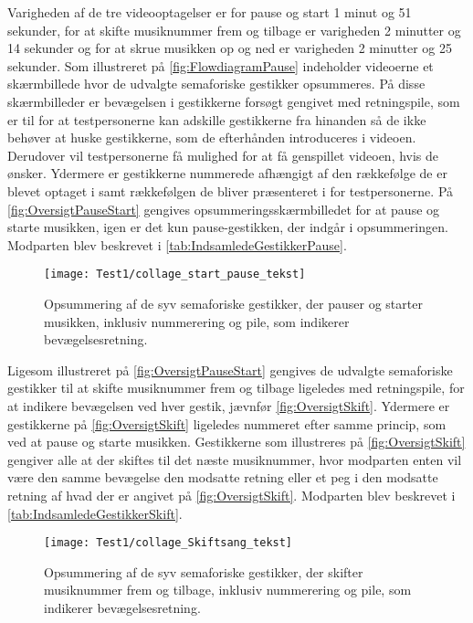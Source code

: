 Varigheden af de tre videooptagelser er for pause og start 1 minut og 51 sekunder, for at skifte musiknummer frem og tilbage er varigheden 2 minutter og 14 sekunder og for at skrue musikken op og ned er varigheden 2 minutter og 25 sekunder.\blankline
%
Som illustreret på \autoref{fig:FlowdiagramPause} indeholder videoerne et skærmbillede hvor de udvalgte semaforiske gestikker opsummeres. På disse skærmbilleder er bevægelsen i gestikkerne forsøgt gengivet med retningspile, som er til for at testpersonerne kan adskille gestikkerne fra hinanden så de ikke behøver at huske gestikkerne, som de efterhånden introduceres i videoen. Derudover vil testpersonerne få mulighed for at få genspillet videoen, hvis de ønsker. Ydermere er gestikkerne nummerede afhængigt af den rækkefølge de er blevet optaget i samt rækkefølgen de bliver præsenteret i for testpersonerne. På \autoref{fig:OversigtPauseStart} gengives opsummeringsskærmbilledet for at pause og starte musikken, igen er det kun pause-gestikken, der indgår i opsummeringen. Modparten blev beskrevet i \autoref{tab:IndsamledeGestikkerPause}.  
% 
\begin{figure}[H]
	\centering
	\texttt{[image: Test1/collage\_start\_pause\_tekst]}
	\caption{Opsummering af de syv semaforiske gestikker, der pauser og starter musikken, inklusiv nummerering og pile, som indikerer bevægelsesretning.}
	\label{fig:OversigtPauseStart}
\end{figure}
\noindent
%
Ligesom illustreret på \autoref{fig:OversigtPauseStart} gengives de udvalgte semaforiske gestikker til at skifte musiknummer frem og tilbage ligeledes med retningspile, for at indikere bevægelsen ved hver gestik, jævnfør \autoref{fig:OversigtSkift}. Ydermere er gestikkerne på \autoref{fig:OversigtSkift} ligeledes nummeret efter samme princip, som ved at pause og starte musikken. Gestikkerne som illustreres på \autoref{fig:OversigtSkift} gengiver alle at der skiftes til det næste musiknummer, hvor modparten enten vil være den samme bevægelse den modsatte retning eller et peg i den modsatte retning af hvad der er angivet på \autoref{fig:OversigtSkift}. Modparten blev beskrevet i \autoref{tab:IndsamledeGestikkerSkift}.
%
\begin{figure}[H]
	\centering
	\texttt{[image: Test1/collage\_Skiftsang\_tekst]}
	\caption{Opsummering af de syv semaforiske gestikker, der skifter musiknummer frem og tilbage, inklusiv nummerering og pile, som indikerer bevægelsesretning.}
	\label{fig:OversigtSkift}
\end{figure}
